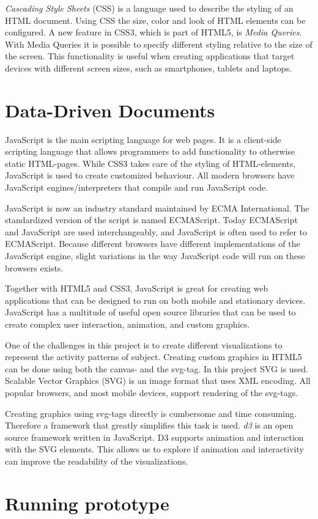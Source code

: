 \emph{Cascading Style Sheets} (CSS) is a language used to describe the styling of an HTML document. Using CSS the size, color and look of HTML elements can be configured. A new feature in CSS3, which is part of HTML5, is \emph{Media Queries}. With Media Queries it is possible to specify different styling relative to the size of the screen. This functionality is useful when creating applications that target devices with different screen sizes, such as smartphones, tablets and laptops. 

\section{Data-Driven Documents}
JavaScript is the main scripting language for web pages. It is a client-side scripting language that allows programmers to add functionality to otherwise static HTML-pages. While CSS3 takes care of the styling of HTML-elements, JavaScript is used to create customized behaviour. All modern browsers have JavaScript engines/interpreters that compile and run JavaScript code.

JavaScript is now an industry standard maintained by ECMA International. The standardized version of the script is named ECMAScript. Today ECMAScript and JavaScript are used interchangeably, and JavaScript is often used to refer to ECMAScript. Because different browsers have different implementations of the JavaScript engine, slight variations in the way JavaScript code will run on these browsers exists.

Together with HTML5 and CSS3, JavaScript is great for creating web applications that can be designed to run on both mobile and stationary devices. JavaScript has a multitude of useful open source libraries that can be used to create complex user interaction, animation, and custom graphics.

One of the challenges in this project is to create different visualizations to represent the activity patterns of subject. Creating custom graphics in HTML5 can be done using both the canvas- and the svg-tag. In this project SVG is used. Scalable Vector Graphics (SVG) is an image format that uses XML encoding. All popular browsers, and most mobile devices, support rendering of the svg-tags.

Creating graphics using svg-tags directly is cumbersome and time consuming. Therefore a framework that greatly simplifies this task is used. \emph{\gls{d3}} is an open source framework written in JavaScript. D3 supports animation and interaction with the SVG elements. This allows us to explore if animation and interactivity can improve the readability of the visualizations.

\section{Running prototype}

